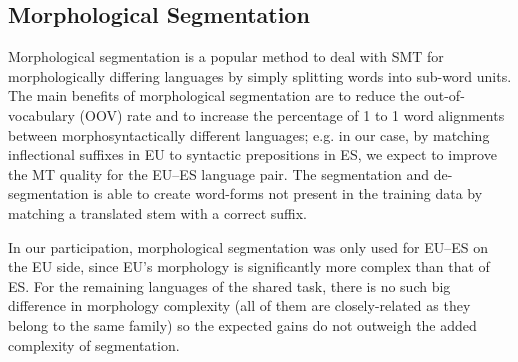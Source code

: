 \documentclass[postprint]{flammie}
\begin{document}







\subsection{Morphological Segmentation}\label{sec:morph_seg}
Morphological segmentation is a popular method to deal with SMT for morphologically differing languages by simply splitting words into sub-word units.
The main benefits of morphological segmentation are to reduce the out-of-vocabulary (OOV) rate and to increase the percentage of 1 to 1 word alignments between morphosyntactically different languages; e.g. in our case, by matching inflectional suffixes in EU to syntactic prepositions in ES, we expect to improve the MT quality for the EU--ES language pair. The segmentation and de-segmentation is able to create word-forms not present in the training data by matching a translated stem with a correct suffix.

In our participation, morphological segmentation was only used for EU--ES on the EU side, since EU's morphology is significantly more complex than that of ES. For the remaining languages of the shared task, there is no such big difference in morphology complexity (all of them are closely-related as they belong to the same family) so the expected gains do not outweigh the added complexity of segmentation.
\end{document}
